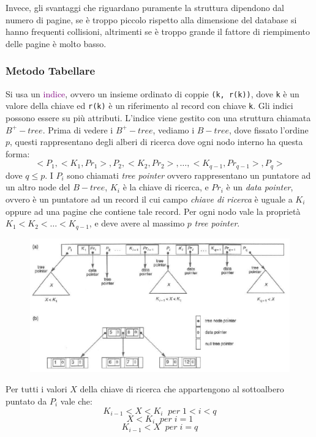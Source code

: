 Invece, gli svantaggi che riguardano puramente la struttura dipendono dal numero di pagine, se è troppo
piccolo rispetto alla dimensione del database si hanno frequenti collisioni, altrimenti se è troppo grande il
fattore di riempimento delle pagine è molto basso.

\subsubsection{Metodo Tabellare}

Si usa un \textcolor{purple}{indice}, ovvero un insieme ordinato
di coppie \verb|(k, r(k))|, dove \verb|k| è un valore della chiave ed \verb|r(k)|
è un riferimento al record con chiave \verb|k|. Gli indici possono essere
su più attributi. L'indice viene gestito con una struttura chiamata
$B^+-tree$. Prima di vedere i $B^+-tree$, vediamo i $B-tree$, dove fissato l'ordine
$p$, questi rappresentano degli alberi di ricerca dove ogni nodo interno ha questa forma:
\begin{equation*}
    <P_1, <K_1, Pr_1>, P_2, <K_2, Pr_2>, \dots, <K_{q-1}, Pr_{q-1}>, P_q>
\end{equation*}
dove $q \leq p$. I $P_i$ sono chiamati \emph{tree pointer} ovvero rappresentano
un puntatore ad un altro node del $B-tree$, $K_i$ è la chiave di ricerca, e $Pr_i$
è un \emph{data pointer}, ovvero è un puntatore ad un record il cui campo \emph{chiave di ricerca}
è uguale a $K_i$ oppure ad una pagine che contiene tale record.
Per ogni nodo vale la proprietà $K_1 < K_2 < \dots < K_{q-1}$, e deve avere al massimo
$p$ \emph{tree pointer}.

\begin{figure}[H]
    \centering
    \includegraphics[scale=0.37]{img/btree.png}
\end{figure}

Per tutti i valori $X$ della chiave di ricerca che appartengono al
sottoalbero puntato da $P_i$ vale che:
\begin{equation*}
    K_{i-1} < X < K_i \;\;per\; 1 < i < q
\end{equation*}
\begin{equation*}
    X < K_i \;\;per\; i = 1
\end{equation*}
\begin{equation*}
    K_{i-1} < X \;\;per\; i = q
\end{equation*}


